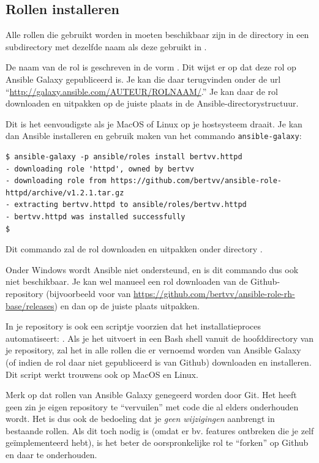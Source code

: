 \subsection{Rollen installeren}
\label{sub:rollen-installeren}

Alle rollen die gebruikt worden in  moeten beschikbaar zijn in de directory  in een subdirectory met dezelfde naam als deze gebruikt in .

De naam van de rol  is geschreven in de vorm . Dit wijst er op dat deze rol op Ansible Galaxy gepubliceerd is. Je kan die daar terugvinden onder de url ``\url{http://galaxy.ansible.com/AUTEUR/ROLNAAM/}.'' Je kan daar de rol downloaden en uitpakken op de juiste plaats in de Ansible-directorystructuur.

Dit is het eenvoudigste als je MacOS of Linux op je hostsysteem draait. Je kan dan Ansible installeren en gebruik maken van het commando \texttt{ansible-galaxy}:

\begin{verbatim}
$ ansible-galaxy -p ansible/roles install bertvv.httpd
- downloading role 'httpd', owned by bertvv
- downloading role from https://github.com/bertvv/ansible-role-httpd/archive/v1.2.1.tar.gz
- extracting bertvv.httpd to ansible/roles/bertvv.httpd
- bertvv.httpd was installed successfully
$
\end{verbatim}

Dit commando zal de rol  downloaden en uitpakken onder directory .

Onder Windows wordt Ansible niet ondersteund, en is dit commando dus ook niet beschikbaar. Je kan wel manueel een rol downloaden van de Github-repository (bijvoorbeeld voor  van \url{https://github.com/bertvv/ansible-role-rh-base/releases}) en dan op de juiste plaats uitpakken.

In je repository is ook een scriptje voorzien dat het installatieproces automatiseert: . Als je het uitvoert in een Bash shell vanuit de hoofddirectory van je repository, zal het in  alle rollen die er vernoemd worden van Ansible Galaxy (of indien de rol daar niet gepubliceerd is van Github) downloaden en installeren. Dit script werkt trouwens ook op MacOS en Linux.

Merk op dat rollen van Ansible Galaxy genegeerd worden door Git. Het heeft geen zin je eigen repository te ``vervuilen'' met code die al elders onderhouden wordt. Het is dus ook de bedoeling dat je \emph{geen wijzigingen} aanbrengt in bestaande rollen. Als dit toch nodig is (omdat er bv. features ontbreken die je zelf geïmplementeerd hebt), is het beter de oorspronkelijke rol te ``forken'' op Github en daar te onderhouden.

